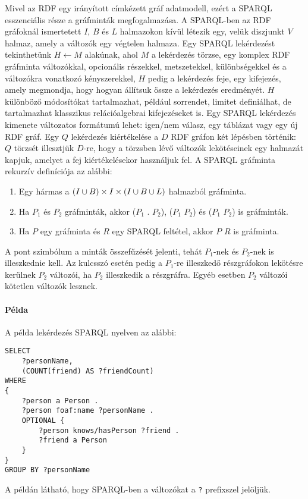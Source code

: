 Mivel az RDF egy irányított címkézett gráf adatmodell, ezért a SPARQL esszenciális része a gráfminták megfogalmazása. A SPARQL-ben az RDF gráfoknál ismertetett $I$, $B$ és $L$ halmazokon kívül létezik egy, velük diszjunkt $V$ halmaz, amely a változók egy végtelen halmaza. Egy SPARQL lekérdezést tekinthetünk $H \longleftarrow M$ alakúnak, ahol $M$ a lekérdezés törzse, egy komplex RDF gráfminta változókkal, opcionális részekkel, metszetekkel, különbségekkel és a változókra vonatkozó kényszerekkel, $H$ pedig a lekérdezés feje, egy kifejezés, amely megmondja, hogy hogyan állítsuk össze a lekérdezés eredményét. $H$ különböző módosítókat tartalmazhat, például sorrendet, limitet definiálhat, de tartalmazhat klasszikus relációalgebrai kifejezéseket is. Egy SPARQL lekérdezés kimenete változatos formátumú lehet: igen/nem válasz, egy táblázat vagy egy új RDF gráf. Egy $Q$ lekérdezés kiértékelése a $D$ RDF gráfon két lépésben történik: $Q$ törzsét illesztjük $D$-re, hogy a törzsben lévő változók lekötéseinek egy halmazát kapjuk, amelyet a fej kiértékelésekor használjuk fel. A SPARQL gráfminta rekurzív definíciója az alábbi:
\begin{enumerate}
	\item Egy hármas a $(I \cup B) \times I \times (I \cup B \cup L)$ halmazból gráfminta.
	\item Ha $P_1$ és $P_2$ gráfminták, akkor ($P_1$ . $P_2$), ($P_1$  $P_2$) és ($P_1$  $P_2$) is gráfminták.
	\item Ha $P$ egy gráfminta és $R$ egy SPARQL feltétel, akkor $P$  $R$ is gráfminta.
\end{enumerate}
A pont szimbólum a minták összefűzését jelenti, tehát $P_1$-nek és $P_2$-nek is illeszkednie kell. Az  kulcsszó esetén pedig a $P_1$-re illeszkedő részgráfokon lekötésre kerülnek $P_2$ változói, ha $P_2$ illeszkedik a részgráfra. Egyéb esetben $P_2$ változói kötetlen változók lesznek.

\paragraph{Példa}

A példa lekérdezés SPARQL nyelven az alábbi:

\vspace{1.5ex}

\noindent\begin{minipage}{\textwidth}
\begin{lstlisting}[frame=single, morekeywords={SELECT}, caption=SPARQL példakód]
SELECT
    ?personName,
    (COUNT(friend) AS ?friendCount)
WHERE
{
    ?person a Person .
    ?person foaf:name ?personName .
    OPTIONAL {
        ?person knows/hasPerson ?friend .
        ?friend a Person
    }
}
GROUP BY ?personName
\end{lstlisting}
\end{minipage}
A példán látható, hogy SPARQL-ben a változókat a \texttt{?} prefixszel jelöljük.

